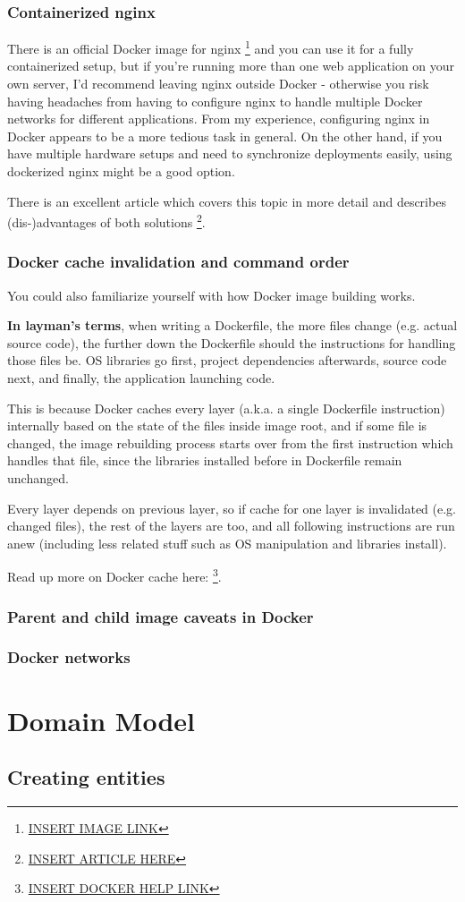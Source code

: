 \documentclass{article}
\newcommand{\flink}[1]{\footnote{\href{#1}{#1}}}
\begin{document}
\subsubsection{Containerized nginx}

There is an official Docker image for nginx \flink{INSERT IMAGE LINK} and you can use it for a fully containerized setup, but if you're running more than one web application on your own server, I'd recommend leaving nginx outside Docker - otherwise you risk having headaches from having to configure nginx to handle multiple Docker networks for different applications. From my experience, configuring nginx in Docker appears to be a more tedious task in general. On the other hand, if you have multiple hardware setups and need to synchronize deployments easily, using dockerized nginx might be a good option.

There is an excellent article which covers this topic in more detail and describes (dis-)advantages of both solutions \flink {INSERT ARTICLE HERE}.

\subsubsection{Docker cache invalidation and command order}

You could also familiarize yourself with how Docker image building works.

\textbf{In layman's terms}, when writing a Dockerfile, the more files change (e.g. actual source code), the further down the Dockerfile should the instructions for handling those files be. OS libraries go first, project dependencies afterwards, source code next, and finally, the application launching code.

This is because Docker caches every layer (a.k.a. a single Dockerfile instruction) internally based on the state of the files inside image root, and if some file is changed, the image rebuilding process starts over from the first instruction which handles that file, since the libraries installed before in Dockerfile remain unchanged.

Every layer depends on previous layer, so if cache for one layer is invalidated (e.g. changed files), the rest of the layers are too, and all following instructions are run anew (including less related stuff such as OS manipulation and libraries install).

Read up more on Docker cache here: \flink{INSERT DOCKER HELP LINK}.

\subsubsection{Parent and child image caveats in Docker}

\subsubsection{Docker networks}

\section{Domain Model}

\subsection{Creating entities}
\end{document}
